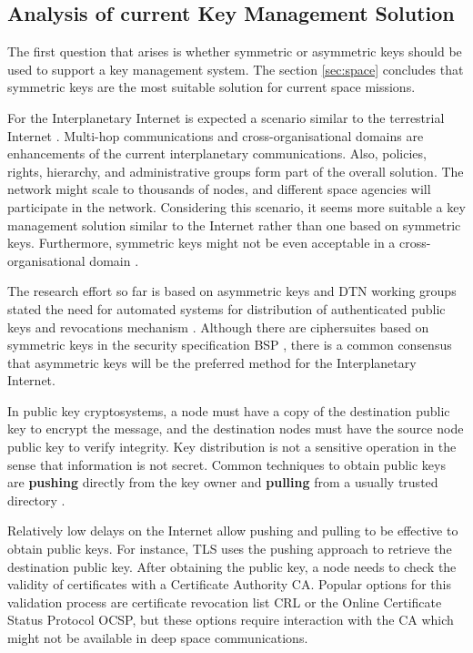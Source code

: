\subsection{Analysis of current Key Management Solution}


The first question that arises is whether symmetric or asymmetric keys should be used to support a key management system.  The section  \ref{sec:space} concludes that symmetric keys are the most suitable solution for current space missions. 

For the Interplanetary Internet is expected a scenario similar to the terrestrial Internet \cite{rationale2010requirements}. Multi-hop communications and cross-organisational domains are enhancements of the current interplanetary communications. Also, policies, rights, hierarchy, and administrative groups form part of the overall solution. The network might scale to thousands of nodes, and different space agencies will participate in the network. Considering this scenario, it seems more suitable a key management solution similar to the Internet rather than one based on symmetric keys. Furthermore, symmetric keys might not be even acceptable in a cross-organisational domain \cite{ivancic2009security}.

The research effort so far is based on asymmetric keys and DTN working groups stated the need for automated systems for distribution of authenticated public keys and revocations mechanism \cite{templin-dtnskmps-00}. Although there are ciphersuites based on symmetric keys in the security specification BSP \cite{ietf-dtn-bpsec-07}, there is a common consensus that asymmetric keys will be the preferred method for the Interplanetary Internet. 

In public key cryptosystems, a node must have a copy of the destination public key to encrypt the message, and the destination nodes must have the source node public key to verify integrity. Key distribution is not a sensitive operation in the sense that information is not secret.  Common techniques  to obtain public keys are \textbf{pushing} directly from the key owner and \textbf{pulling} from a usually trusted directory \cite{martineveryday}.

Relatively low delays on the Internet allow pushing and pulling to be effective to obtain public keys. For instance, TLS uses the pushing approach to retrieve the destination public key. After obtaining the public key, a node needs to check the validity of certificates with a Certificate Authority CA. Popular options for this validation process are certificate revocation list CRL or the Online Certificate Status Protocol OCSP, but these options require interaction with the CA which might not be available in deep space communications. 

